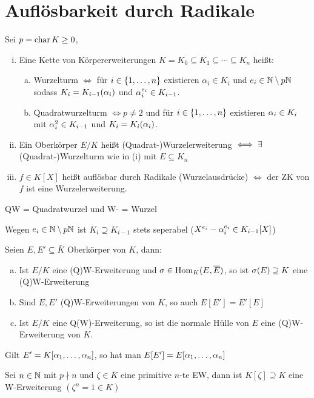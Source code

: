 \documentclass[a4paper]{report}
\begin{document}
\section{Auflösbarkeit durch Radikale}%
\begin{defi}
  Sei $p = \operatorname{char} K \ge 0$,
  \begin{enumerate}[(i)]
    \item Eine Kette von Körpererweiterungen $K = K_{0} \subseteq K_{1} \subseteq \cdots \subseteq K_{n}$ heißt:
          \begin{enumerate}[(a)]
            \item Wurzelturm $\iff$ für $i \in \{1, \ldots, n\}$ existieren $\alpha_{i} \in K_{i}$ und $e_{i} \in \mathbb{N} \setminus p\mathbb{N}$ sodass $K_{i} = K_{i-1}(\alpha_{i})$ und $\alpha_{i}^{e_{i}} \in K_{i-1}$.
            \item Quadratwurzelturm $\iff p \ne 2$ und für $i \in \{1, \ldots, n\}$ existieren $\alpha_{i} \in K_{i}$ mit $\alpha_{i}^{2} \in K_{i-1}$ und $K_{i} = K_{i}(\alpha_{i})$.
          \end{enumerate}
    \item Ein Oberkörper $E/K$ heißt (Quadrat-)Wurzelerweiterung $\iff \exists$ (Quadrat-)Wurzelturm wie in (i) mit $E \subseteq K_{n}$
          \item $f \in K[X]$ heißt auflösbar durch Radikale (Wurzelausdrücke) $\iff$ der ZK von $f$ ist eine Wurzelerweiterung.
  \end{enumerate}
\begin{nota*}
QW = Quadratwurzel und W- = Wurzel
\end{nota*}
\end{defi}

\begin{bem*}[Übung]
Wegen $e_{i} \in \mathbb{N} \setminus p \mathbb{N}$ ist $K_{i} \supseteq K_{i-1}$ stets seperabel ($X^{e_{i}} - \alpha_{i}^{e_{i}} \in K_{i-1}[X]$)
\end{bem*}
\begin{lemm}
  Seien $E, E' \subseteq \bar K$ Oberkörper von $K$, dann:
  \begin{enumerate}[(a)]
    \item Ist $E/K$ eine (Q)W-Erweiterung und $\sigma \in \operatorname{Hom}_{K}(E,\overline E)$, so ist $\sigma(E) \supseteq K$ eine (Q)W-Erweiterung
    \item Sind $E, E'$ (Q)W-Erweiterungen von $K$, so auch $E[E'] = E'[E]$
    \item Ist $E/K$ eine Q(W)-Erweiterung, so ist die normale Hülle von $E$ eine (Q)W-Erweiterung von $K$.
  \end{enumerate}
\end{lemm}
\begin{bem*}
Gilt $E' = K[\alpha_{1}, \ldots, \alpha_{n}]$, so hat man $E[E'] = E[\alpha_{1}, \ldots, \alpha_{n}]$
\end{bem*}
\begin{bsp}
  Sei $n \in \mathbb{N}$ mit $p \nmid n$ und $\zeta \in \bar K$ eine primitive $n$-te EW, dann ist $K[\zeta] \supseteq K$ eine W-Erweiterung $(\zeta^{n} = 1 \in K)$
\end{bsp}
\end{document}
